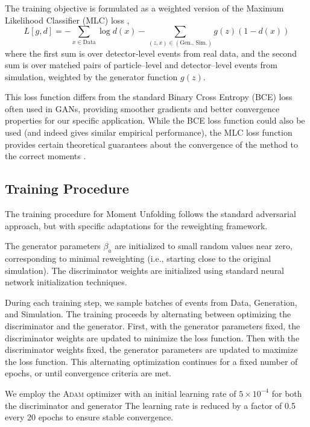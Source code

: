     The training objective is formulated as a weighted version of the Maximum Likelihood Classifier (MLC) loss ,
    \[
        L[g,d] = -\sum_{x \in \text{Data}} \log d(x) - \sum_{(z,x) \in (\text{Gen., Sim.})} g(z)(1-d(x))
    \]
    where the first sum is over detector-level events from real data, and the second sum is over matched pairs of particle--level and detector--level events from simulation, weighted by the generator function $g(z)$.

    This loss function differs from the standard Binary Cross Entropy (BCE) loss often used in GANs, providing smoother gradients and better convergence properties for our specific application.
    While the BCE loss function could also be used (and indeed gives similar empirical performance), the MLC loss function provides certain theoretical guarantees about the convergence of the method to the correct moments .
    \subsection{Training Procedure}
        The training procedure for Moment Unfolding follows the standard adversarial approach, but with specific adaptations for the reweighting framework.
        
        The generator parameters $\beta_a$ are initialized to small random values near zero, corresponding to minimal reweighting (i.e., starting close to the original simulation).
        The discriminator weights are initialized using standard neural network initialization techniques.
        
        During each training step, we sample batches of events from Data, Generation, and Simulation.
        The training proceeds by alternating between optimizing the discriminator and the generator.
        First, with the generator parameters fixed, the discriminator weights are updated to minimize the loss function.
        Then with the discriminator weights fixed, the generator parameters are updated to maximize the loss function.
        This alternating optimization continues for a fixed number of epochs, or until convergence criteria are met.

        We employ the \textsc{Adam} optimizer  with an initial learning rate of $5 \times 10^{-4}$ for both the discriminator and generator
        The learning rate is reduced by a factor of 0.5 every 20 epochs to ensure stable convergence.

